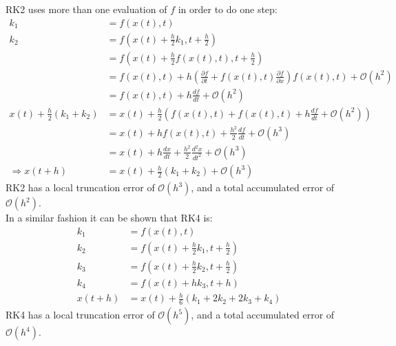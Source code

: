 \noindent
RK2 uses more than one evaluation of $f$ in order to do one step:
\begin{align*}
k_1 &= f(x(t),t)\\
k_2 &= f(x(t) + \frac{h}{2} k_1, t + \frac{h}{2})\\
&= f(x(t) + \frac{h}{2} f(x(t),t), t + \frac{h}{2})\\
&= f(x(t),t) + h\left(\frac{\partial f}{\partial t} + f(x(t),t)\frac{\partial f}{\partial x}\right)f(x(t),t) + \mathcal{O}(h^2)\\
&= f(x(t),t) + h\frac{df}{dt} + \mathcal{O}(h^2)\\
x(t) + \frac{h}{2} (k_1+k_2) &= x(t) + \frac{h}{2} \left(f(x(t),t) + f(x(t),t) + h\frac{df}{dt} + \mathcal{O}(h^2)\right)\\
&= x(t) + h f(x(t),t) + \frac{h^2}{2} \frac{df}{dt} + \mathcal{O}(h^3)\\
&= x(t) + h \frac{dx}{dt} + \frac{h^2}{2} \frac{d^2x}{dt^2} + \mathcal{O}(h^3)\\
\Rightarrow x(t+h) &= x(t) + \frac{h}{2} (k_1+k_2) + \mathcal{O}(h^3)
\end{align*}
RK2 has a local truncation error of $\mathcal{O}(h^3)$, and a total accumulated error of $\mathcal{O}(h^2)$.
\\

\noindent
In a similar fashion it can be shown that RK4 is:
\begin{align*}
k_1 &= f(x(t),t)\\
k_2 &= f\left(x(t)+\frac{h}{2}k_1,t+\frac{h}{2}\right)\\
k_3 &= f\left(x(t)+\frac{h}{2}k_2,t+\frac{h}{2}\right)\\
k_4 &= f(x(t) + h k_3, t + h)\\
x(t+h) &= x(t) + \frac{h}{6}(k_1+2k_2+2k_3+k_4)
\end{align*}
RK4 has a local truncation error of $\mathcal{O}(h^5)$, and a total accumulated error of $\mathcal{O}(h^4)$.

